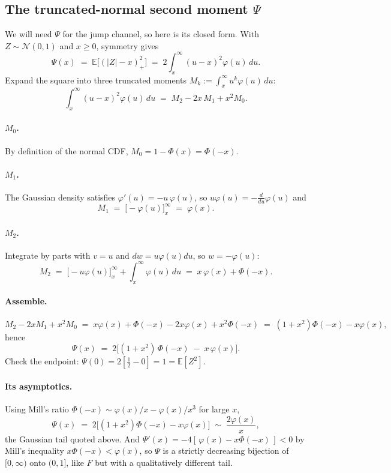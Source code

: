 \documentclass[11pt]{article}
\theoremstyle{definition}
\theoremstyle{remark}
\newcommand{\E}{\mathbb{E}}
\newcommand{\1}{\mathbf{1}}
\begin{document}
\subsection{The truncated-normal second moment \texorpdfstring{$\Psi$}{Psi}}\label{sec:psi}

We will need $\Psi$ for the jump channel, so here is its closed form. With $Z \sim \mathcal N(0,1)$ and $x \ge 0$, symmetry gives
\[
\Psi(x) \;=\; \E\big[(|Z|-x)_+^2\big] \;=\; 2\int_x^\infty (u-x)^2\varphi(u)\,du .
\]
Expand the square into three truncated moments $M_k := \int_x^\infty u^k\varphi(u)\,du$:
\[
\int_x^\infty (u-x)^2\varphi(u)\,du \;=\; M_2 - 2x\,M_1 + x^2 M_0 .
\]

\paragraph{$M_0$.} By definition of the normal CDF, $M_0 = 1 - \Phi(x) = \Phi(-x)$.

\paragraph{$M_1$.} The Gaussian density satisfies $\varphi'(u) = -u\,\varphi(u)$, so $u\varphi(u) = -\tfrac{d}{du}\varphi(u)$ and
\[
M_1 \;=\; \big[-\varphi(u)\big]_x^\infty \;=\; \varphi(x).
\]

\paragraph{$M_2$.} Integrate by parts with $v = u$ and $dw = u\varphi(u)du$, so $w = -\varphi(u)$:
\[
M_2 \;=\; \big[-u\varphi(u)\big]_x^\infty + \int_x^\infty \varphi(u)\,du \;=\; x\,\varphi(x) + \Phi(-x).
\]

\paragraph{Assemble.}
\[
M_2 - 2xM_1 + x^2M_0 \;=\; x\varphi(x) + \Phi(-x) - 2x\varphi(x) + x^2\Phi(-x) \;=\; (1+x^2)\Phi(-x) - x\varphi(x),
\]
hence
\begin{equation}\label{eq:psi}
\boxed{\;\Psi(x) \;=\; 2\big[(1+x^2)\,\Phi(-x) \;-\; x\,\varphi(x)\big]. \;}
\end{equation}
Check the endpoint: $\Psi(0) = 2[\tfrac12 - 0] = 1 = \E[Z^2]$. \checkmark

\paragraph{Its asymptotics.} Using Mill's ratio $\Phi(-x) \sim \varphi(x)/x - \varphi(x)/x^3$ for large $x$,
\[
\Psi(x) \;=\; 2\big[(1+x^2)\Phi(-x) - x\varphi(x)\big] \;\sim\; \frac{2\varphi(x)}{x},
\]
the Gaussian tail quoted above. And $\Psi'(x) = -4[\,\varphi(x) - x\Phi(-x)\,] < 0$ by Mill's inequality $x\Phi(-x) < \varphi(x)$, so $\Psi$ is a strictly decreasing bijection of $[0,\infty)$ onto $(0,1]$, like $F$ but with a qualitatively different tail.
\end{document}
